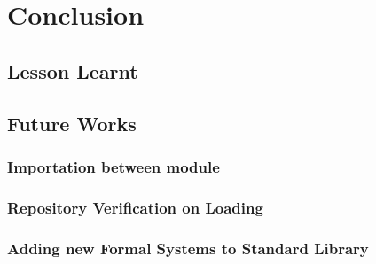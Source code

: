 \documentclass[master.tex]{subfiles}
\begin{document}
\chapter{Conclusion}

\section{Lesson Learnt}

\section{Future Works}
\subsection{Importation between module}
\subsection{Repository Verification on Loading}
\subsection{Adding new Formal Systems to Standard Library}
\end{document}

